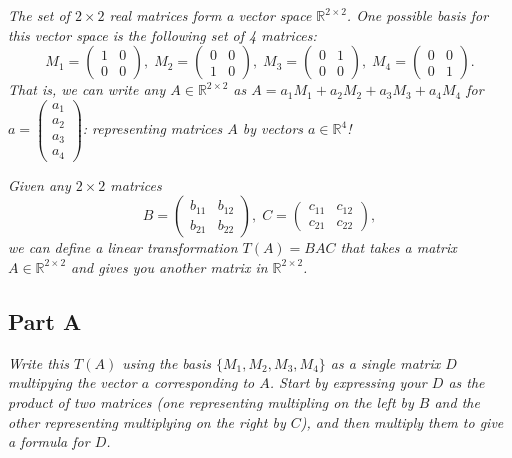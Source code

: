 \documentclass{article}
\begin{document}
\textit{The set of $2\times 2$ real matrices form a vector space
$\mathbb{R}^{2\times2}$. One possible basis for this vector space is the
following set of 4 matrices:}
$$ M_1 = \begin{pmatrix}
    1 & 0 \\
    0 & 0
\end{pmatrix}, \; M_2 = \begin{pmatrix}
    0 & 0 \\
    1 & 0
\end{pmatrix}, \; M_3 = \begin{pmatrix}
    0 & 1 \\
    0 & 0
\end{pmatrix}, \; M_4 = \begin{pmatrix}
    0 & 0 \\
    0 & 1
\end{pmatrix}. $$
\textit{That is, we can write any $A \in \mathbb{R}^{2\times2}$ as $A = a_1
M_1 + a_2 M_2 + a_3 M_3 + a_4 M_4$ for $a = \begin{pmatrix} a_1 \\ a_2 \\ a_3
\\ a_4 \end{pmatrix}$: representing matrices $A$ by vectors $a \in
\mathbb{R}^4$!}

\textit{Given any $2\times 2$ matrices}
$$ B = \begin{pmatrix}
    b_{11} & b_{12} \\
    b_{21} & b_{22}
\end{pmatrix}, \; C = \begin{pmatrix}
    c_{11} & c_{12} \\
    c_{21} & c_{22}
\end{pmatrix}, $$
\textit{we can define a linear transformation $T(A) = BAC$ that takes a
matrix $A \in \mathbb{R}^{2\times2}$ and gives you another matrix in
$\mathbb{R}^{2\times2}$.}

\subsection*{Part A}

\textit{Write this $T(A)$ using the basis $\{ M_1, M_2, M_3, M_4 \}$ as a
single matrix $D$ multipying the vector $a$ corresponding to $A$. Start by
expressing your $D$ as the product of two matrices (one representing
multipling on the left by $B$ and the other representing multiplying on the
right by $C$), and then multiply them to give a formula for $D$.}
\end{document}
